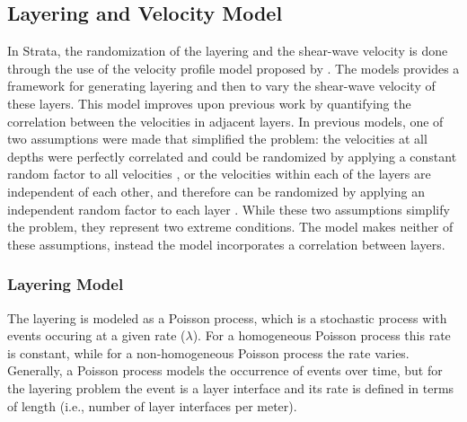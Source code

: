 \documentclass[12pt,oneside]{book}
\begin{document}
\subsection{Layering and Velocity Model}\label{ch:var:models:layering}
In Strata, the randomization of the layering and the shear-wave velocity is done through the
use of the velocity profile model proposed by \citet{toro:95}.  The \citet{toro:95} models provides
a framework for generating layering and then to vary the shear-wave velocity of these layers.   This model
improves upon previous work by quantifying the correlation between the velocities in adjacent
layers.  In previous models, one of two assumptions were made that simplified the problem: the
velocities at all depths were perfectly correlated and could be randomized by applying a constant
random factor to all velocities \citep{mcguire:89, toro:92}, or the velocities within each of the
layers are independent of each other, and therefore can be randomized by applying an independent
random factor to each layer \citep{costantino:91}. While these two assumptions simplify the problem,
they represent two extreme conditions.  The \citet{toro:95} model makes neither of these
assumptions, instead the model incorporates a correlation between layers.

\subsubsection{Layering Model}
The layering is modeled as a Poisson process, which is a stochastic process with events occuring at
a given rate ($\lambda$).  For a homogeneous Poisson process this rate is constant, while for a
non-homogeneous Poisson process the rate varies.  Generally, a Poisson process models the occurrence
of events over time, but for the layering problem the event is a layer interface and its rate is
defined in terms of length (i.e., number of layer interfaces per meter).
\end{document}
